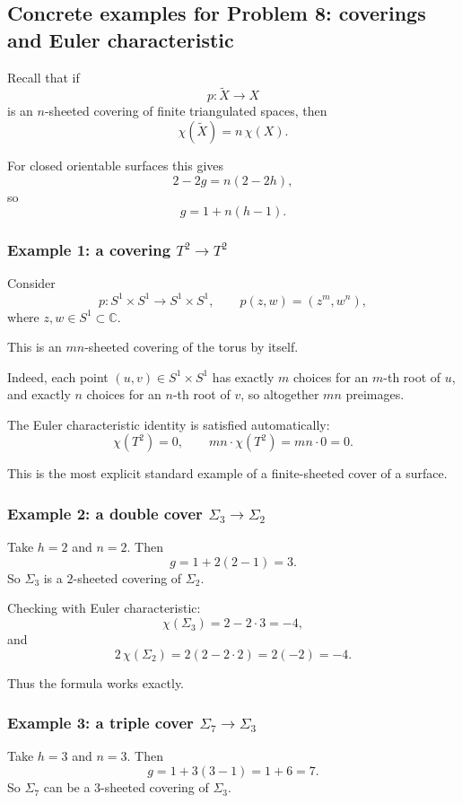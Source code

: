 \documentclass[12pt,a4paper]{article}
\theoremstyle{notespace}
\begin{document}
\subsection{Concrete examples for Problem 8: coverings and Euler characteristic}

Recall that if
\[
p:\widetilde X\to X
\]
is an \(n\)-sheeted covering of finite triangulated spaces, then
\[
\chi(\widetilde X)=n\,\chi(X).
\]

For closed orientable surfaces this gives
\[
2-2g=n(2-2h),
\]
so
\[
g=1+n(h-1).
\]

\subsubsection*{Example 1: a covering \(T^2\to T^2\)}

Consider
\[
p:S^1\times S^1\to S^1\times S^1,\qquad p(z,w)=(z^m,w^n),
\]
where \(z,w\in S^1\subset \mathbb C\).

This is an \(mn\)-sheeted covering of the torus by itself.

Indeed, each point \((u,v)\in S^1\times S^1\) has exactly \(m\) choices for an \(m\)-th root of \(u\), and exactly \(n\) choices for an \(n\)-th root of \(v\), so altogether \(mn\) preimages.

The Euler characteristic identity is satisfied automatically:
\[
\chi(T^2)=0,\qquad mn\cdot \chi(T^2)=mn\cdot 0=0.
\]

This is the most explicit standard example of a finite-sheeted cover of a surface.

\subsubsection*{Example 2: a double cover \(\Sigma_3\to \Sigma_2\)}

Take \(h=2\) and \(n=2\). Then
\[
g=1+2(2-1)=3.
\]
So \(\Sigma_3\) is a \(2\)-sheeted covering of \(\Sigma_2\).

Checking with Euler characteristic:
\[
\chi(\Sigma_3)=2-2\cdot 3=-4,
\]
and
\[
2\,\chi(\Sigma_2)=2(2-2\cdot 2)=2(-2)=-4.
\]

Thus the formula works exactly.

\subsubsection*{Example 3: a triple cover \(\Sigma_7\to \Sigma_3\)}

Take \(h=3\) and \(n=3\). Then
\[
g=1+3(3-1)=1+6=7.
\]
So \(\Sigma_7\) can be a \(3\)-sheeted covering of \(\Sigma_3\).
\end{document}

